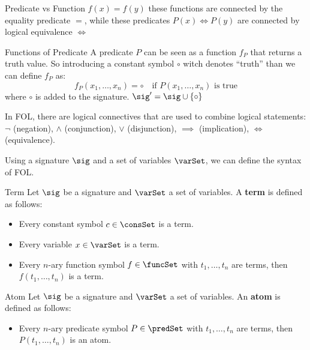 \begin{example}{Predicate vs Function}
    $f(x) = f(y)$ these functions are connected by the equality predicate $=$, 
    while these predicates $P(x) \iff P(y)$ are connected by logical equivalence $\iff$
\end{example}

\begin{remark}{Functions of Predicate}
    A predicate $P$ can be seen as a function $f_P$ that returns a truth value.
    So introducing a constant symbol
    $\circ$ witch denotes ``truth'' than we can define $f_P$ as:
    \begin{equation*}
        f_P(x_1,\dots,x_n) = \circ \quad \text{if } P(x_1,\dots,x_n) \text{ is true}
    \end{equation*} 
    where $\circ$ is added to the signature. 
    $\sig' = \sig \cup \{\circ\}$  
\end{remark}

In FOL, there are logical connectives that 
are used to combine logical statements:
$\neg$ (negation), $\land$ (conjunction), $\lor$ (disjunction), 
$\implies$ (implication), $\iff$ (equivalence).

Using a signature $\sig$ and 
a set of variables $\varSet$, we can define the syntax of FOL.

\begin{definition}{Term}
    Let $\sig$ be a signature and $\varSet$ a set of variables.
    A \textbf{term} is defined as follows:
    \begin{itemize}
        \item Every constant symbol $c \in \consSet$ is a term.
        \item Every variable $x \in \varSet$ is a term.
        \item Every $n$-ary function symbol $f \in \funcSet$ with $t_1,\dots,t_n$ are terms, 
        then $f(t_1,\dots,t_n)$ is a term.
    \end{itemize}
\end{definition}

\begin{definition}{Atom}
    Let $\sig$ be a signature and $\varSet$ a set of variables.
    An \textbf{atom} is defined as follows:
    \begin{itemize}
        \item Every $n$-ary predicate symbol $P \in \predSet$ with $t_1,\dots,t_n$ are terms, 
        then $P(t_1,\dots,t_n)$ is an atom.
    \end{itemize}    
\end{definition}

